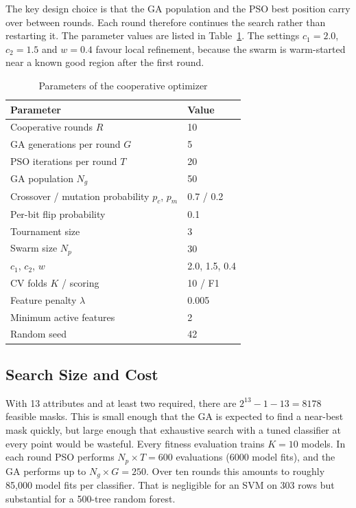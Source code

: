 \documentclass[MTech]{ugthesis}
\begin{document}
The key design choice is that the GA population and the PSO best position carry over between rounds. Each round therefore continues the search rather than restarting it. The parameter values are listed in Table~\ref{tab:params}. The settings $c_1=2.0$, $c_2=1.5$ and $w=0.4$ favour local refinement, because the swarm is warm-started near a known good region after the first round.

\begin{table}[htpb]
\small
\renewcommand{\arraystretch}{1.25}
\caption{Parameters of the cooperative optimizer}
\label{tab:params}
\begin{tabular}{|p{6.5cm}|p{2.5cm}|}
\hline
\textbf{Parameter} & \textbf{Value} \\ \hline
Cooperative rounds $R$ & 10 \\ \hline
GA generations per round $G$ & 5 \\ \hline
PSO iterations per round $T$ & 20 \\ \hline
GA population $N_g$ & 50 \\ \hline
Crossover / mutation probability $p_c$, $p_m$ & 0.7 / 0.2 \\ \hline
Per-bit flip probability & 0.1 \\ \hline
Tournament size & 3 \\ \hline
Swarm size $N_p$ & 30 \\ \hline
$c_1$, $c_2$, $w$ & 2.0, 1.5, 0.4 \\ \hline
CV folds $K$ / scoring & 10 / F1 \\ \hline
Feature penalty $\lambda$ & 0.005 \\ \hline
Minimum active features & 2 \\ \hline
Random seed & 42 \\ \hline
\end{tabular}
\end{table}

\subsection{Search Size and Cost}
With 13 attributes and at least two required, there are $2^{13}-1-13 = 8178$ feasible masks. This is small enough that the GA is expected to find a near-best mask quickly, but large enough that exhaustive search with a tuned classifier at every point would be wasteful. Every fitness evaluation trains $K=10$ models. In each round PSO performs $N_p\times T = 600$ evaluations (6000 model fits), and the GA performs up to $N_g\times G = 250$. Over ten rounds this amounts to roughly 85,000 model fits per classifier. That is negligible for an SVM on 303 rows but substantial for a 500-tree random forest.
\end{document}
